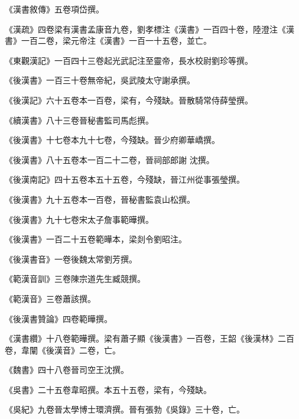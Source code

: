 \begin{pinyinscope}
 《漢書敘傳》五卷項岱撰。



 《漢疏》四卷梁有漢書孟康音九卷，劉孝標注《漢書》一百四十卷，陸澄注《漢書》一百二卷，梁元帝注《漢書》一百一十五卷，並亡。



 《東觀漢記》一百四十三卷起光武記注至靈帝，長水校尉劉珍等撰。



 《後漢書》一百三十卷無帝紀，吳武陵太守謝承撰。



 《後漢記》六十五卷本一百卷，梁有，今殘缺。晉散騎常侍薛瑩撰。



 《續漢書》八十三卷晉秘書監司馬彪撰。



 《後漢書》十七卷本九十七卷，今殘缺。晉少府卿華嶠撰。



 《後漢書》八十五卷本一百二十二卷，晉祠部郎謝
 沈撰。



 《後漢南記》四十五卷本五十五卷，今殘缺，晉江州從事張瑩撰。



 《後漢書》九十五卷本一百卷，晉秘書監袁山松撰。



 《後漢書》九十七卷宋太子詹事範曄撰。



 《後漢書》一百二十五卷範曄本，梁剡令劉昭注。



 《後漢書音》一卷後魏太常劉芳撰。



 《範漢音訓》三卷陳宗道先生臧競撰。



 《範漢音》三卷蕭該撰。



 《後漢書贊論》四卷範曄撰。



 《漢書纘》十八卷範曄撰。梁有蕭子顯《後漢書》一百卷，王韶《後漢林》二百卷，韋闡《後漢音》二卷，亡。



 《魏書》四十八卷晉司空王沈撰。



 《吳書》二十五卷韋昭撰。本五十五卷，梁有，今殘缺。



 《吳紀》九卷晉太學博士環濟撰。晉有張勃《吳錄》三十卷，亡。




\end{pinyinscope}
